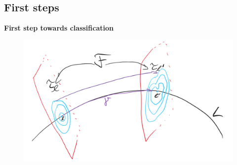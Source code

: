 \documentclass[hyperref={pdfpagelabels=false}]{beamer}
\newcommand\insertreferences{}
\theoremstyle{plain}
\theoremstyle{remark}
\begin{document}
\subsection{First steps}


{
\begin{frame}
\thispagestyle{empty}
\begin{center}
\textbf{\Large First step towards classification}
\end{center}
\end{frame}
}

\renewcommand\insertreferences{{\tiny Camille Laurent-Gengoux and Leonid Ryvkin, The holonomy of a singular leaf, \newline \textit{Selecta Mathematica 28}, no.\ 2, 45, 2022.}}

\begin{frame}
\begin{figure}[htbp]
	\centering
		\includegraphics[width=1.00\textwidth]{Foliation connection.png}
	\label{fig:Foliationconnection}
\end{figure}

\end{frame}
\end{document}
